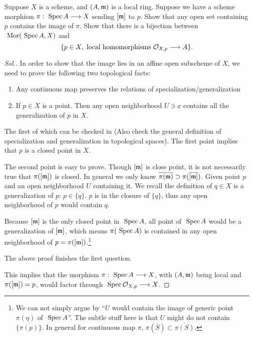 \documentclass[11pt]{book} %
\begin{document}
\begin{exr}
Suppose $X$ is a scheme, and $(A,{\mathfrak m})$ is a local ring. Suppose we have a scheme morphism $\pi:\text{ Spec\,} A\longrightarrow X$ sending $[{\mathfrak m}]$ to $p$. Show that any open set containing $p$ contains the image of $\pi$. Show that there is a bijection between $\text{ Mor}(\text{ Spec\,} A,X)$ and 
$$
\{p\in X,\text{ local homomorphisms }{\cal O}_{X,p}\longrightarrow A\}.
$$
\end{exr}
\begin{proof}[Sol.]
In order to show that the image lies in an affine open subscheme of $X$, we need to prove the following two topological facts:
\begin{enumerate}
\item Any continuous map preserves the relations of specialization/generalization
\item If $p\in X$ is a point. Then any open neighborhood $U\ni x$ contains all the generalization of $p$ in $X$.
\end{enumerate}
The first of which can be checked in \cite[Tag 0060]{stacks-project} (Also check the general definition of specialization and generalization in topological spaces). The first point implies that $p$ is a closed point in $X$.

The second point is easy to prove. Though $[{\mathfrak m}]$ is close point, it is not necessarily true that $\pi([{\mathfrak m}])$ is closed. In general we only know $\overline{\pi({\mathfrak m})}\supset \pi(\overline{[{\mathfrak m}]})$. Given point $p$ and an open neighborhood $U$ containing it. We recall the definition of $q\in X$ is a  generalization of $p$: $p\in \overline{\{q\}}$. $p$ is in the closure of $\{q\}$, thus any open neighborhood of $p$ would contain $q$. 

Because $[{\mathfrak m}]$ is the only closed point in $\text{ Spec\,} A$, all point of $\text{ Spec\,} A$ would be a generalization of $[{\mathfrak m}]$, which means $\pi(\text{ Spec\,} A)$ is contained in any open neighborhood of $p=\pi([{\mathfrak m}])$.\footnote{We can not simply argue by ``$U$ would contain the image of generic point $\pi(\eta)$ of $\text{ Spec\,} A$''. The subtle stuff here is that $U$ might do not contain $\overline{\{\pi(p)\}}$. In general for continuous map $\pi$, $\pi(\overline{S})\subset \overline{\pi(S)}$.}

The above proof finishes the first question.

This implies that the morphism $\pi:\text{ Spec\,} A\longrightarrow X$, with $(A,{\mathfrak m})$ being local and $\pi([{\mathfrak m}])=p$, would factor through $\text{ Spec\,} {\cal O}_{X,p}\longrightarrow X$.


\end{proof}
\end{document}
